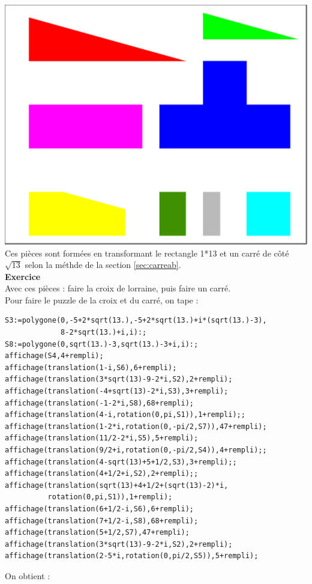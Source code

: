 \documentclass[a4paper,11pt]{book}
\begin{document}
\includegraphics[width=\textwidth]{puzzlecroix14}\\
Ces pi\`eces sont form\'ees en transformant le rectangle 1*13 et un carr\'e de 
c\^ot\'e $\sqrt{13}$ selon la m\'ethde de la section \ref{sec:carreab}.\\ 

{\bf Exercice}\\
 Avec ces pi\`eces :
faire la croix de lorraine, puis faire un carr\'e.\\

Pour faire le puzzle de la croix et du carr\'e, on tape :
\begin{verbatim}
S3:=polygone(0,-5+2*sqrt(13.),-5+2*sqrt(13.)+i*(sqrt(13.)-3),
             8-2*sqrt(13.)+i,i):;
S8:=polygone(0,sqrt(13.)-3,sqrt(13.)-3+i,i):;
affichage(S4,4+rempli);
affichage(translation(1-i,S6),6+rempli);
affichage(translation(3*sqrt(13)-9-2*i,S2),2+rempli);
affichage(translation(-4+sqrt(13)-2*i,S3),3+rempli);
affichage(translation(-1-2*i,S8),68+rempli);
affichage(translation(4-i,rotation(0,pi,S1)),1+rempli);;
affichage(translation(1-2*i,rotation(0,-pi/2,S7)),47+rempli);
affichage(translation(11/2-2*i,S5),5+rempli);
affichage(translation(9/2+i,rotation(0,-pi/2,S4)),4+rempli);;
affichage(translation(4-sqrt(13)+5+1/2,S3),3+rempli);;
affichage(translation(4+1/2+i,S2),2+rempli);;
affichage(translation(sqrt(13)+4+1/2+(sqrt(13)-2)*i,
          rotation(0,pi,S1)),1+rempli);
affichage(translation(6+1/2-i,S6),6+rempli);
affichage(translation(7+1/2-i,S8),68+rempli);
affichage(translation(5+1/2,S7),47+rempli);
affichage(translation(3*sqrt(13)-9-2*i,S2),2+rempli);
affichage(translation(2-5*i,rotation(0,pi/2,S5)),5+rempli);
\end{verbatim}
On obtient :\\
\end{document}
